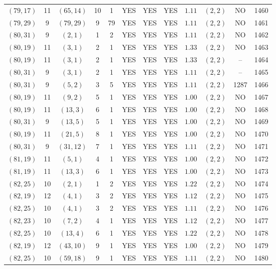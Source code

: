 \begin{longtable}{|c|c|c|c|c|c|c|c|c|c|c|c|}
$(79,17)$ & 11 & $(65,14)$ & 10 & 1 & YES & YES & YES & $1.11$ & $(2,2)$ & NO & 1460\\
$(79,29)$ & 9 & $(79,29)$ & 9 & 79 & YES & YES & YES & $1.11$ & $(2,2)$ & NO & 1461\\
$(80,31)$ & 9 & $(2,1)$ & 1 & 2 & YES & YES & YES & $1.11$ & $(2,2)$ & NO & 1462\\
$(80,19)$ & 11 & $(3,1)$ & 2 & 1 & YES & YES & YES & $1.33$ & $(2,2)$ & NO & 1463\\
$(80,19)$ & 11 & $(3,1)$ & 2 & 1 & YES & YES & YES & $1.33$ & $(2,2)$ & -- & 1464\\
$(80,31)$ & 9 & $(3,1)$ & 2 & 1 & YES & YES & YES & $1.11$ & $(2,2)$ & -- & 1465\\
$(80,31)$ & 9 & $(5,2)$ & 3 & 5 & YES & YES & YES & $1.11$ & $(2,2)$ & 1287 & 1466\\
$(80,19)$ & 11 & $(9,2)$ & 5 & 1 & YES & YES & YES & $1.00$ & $(2,2)$ & NO & 1467\\
$(80,19)$ & 11 & $(13,3)$ & 6 & 1 & YES & YES & YES & $1.00$ & $(2,2)$ & NO & 1468\\
$(80,31)$ & 9 & $(13,5)$ & 5 & 1 & YES & YES & YES & $1.00$ & $(2,2)$ & NO & 1469\\
$(80,19)$ & 11 & $(21,5)$ & 8 & 1 & YES & YES & YES & $1.00$ & $(2,2)$ & NO & 1470\\
$(80,31)$ & 9 & $(31,12)$ & 7 & 1 & YES & YES & YES & $1.11$ & $(2,2)$ & NO & 1471\\
$(81,19)$ & 11 & $(5,1)$ & 4 & 1 & YES & YES & YES & $1.00$ & $(2,2)$ & NO & 1472\\
$(81,19)$ & 11 & $(13,3)$ & 6 & 1 & YES & YES & YES & $1.00$ & $(2,2)$ & NO & 1473\\
$(82,25)$ & 10 & $(2,1)$ & 1 & 2 & YES & YES & YES & $1.22$ & $(2,2)$ & NO & 1474\\
$(82,19)$ & 12 & $(4,1)$ & 3 & 2 & YES & YES & YES & $1.12$ & $(2,2)$ & NO & 1475\\
$(82,25)$ & 10 & $(4,1)$ & 3 & 2 & YES & YES & YES & $1.11$ & $(2,2)$ & NO & 1476\\
$(82,23)$ & 10 & $(7,2)$ & 4 & 1 & YES & YES & YES & $1.12$ & $(2,2)$ & NO & 1477\\
$(82,25)$ & 10 & $(13,4)$ & 6 & 1 & YES & YES & YES & $1.22$ & $(2,2)$ & NO & 1478\\
$(82,19)$ & 12 & $(43,10)$ & 9 & 1 & YES & YES & YES & $1.00$ & $(2,2)$ & NO & 1479\\
$(82,25)$ & 10 & $(59,18)$ & 9 & 1 & YES & YES & YES & $1.11$ & $(2,2)$ & NO & 1480\\

\end{longtable}
